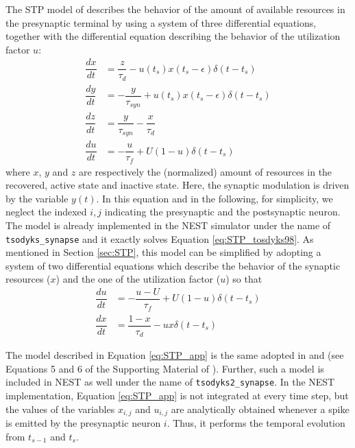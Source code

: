 \documentclass[a4paper, 12pt, twoside, openright]{book}
\begin{document}
The STP model of \cite{tsodyks1998, tsodyks2000} describes the behavior of the amount of available resources in the presynaptic terminal by using a system of three differential equations, together with the differential equation describing the behavior of the utilization factor $u$:
\begin{equation}
    \label{eq:STP_tosdyks98}
    \begin{split}
    \dfrac{dx}{dt} &= \dfrac{z}{\tau_d} - u(t_s)x(t_s -\epsilon) \delta (t-t_s) \\
    \dfrac{dy}{dt} &= -\dfrac{y}{\tau_{syn}} + u(t_s)x(t_s-\epsilon) \delta (t-t_s) \\
    \dfrac{dz}{dt} &= \dfrac{y}{\tau_{syn}} - \dfrac{x}{\tau_{d}} \\
    \dfrac{du}{dt} &= -\dfrac{u}{\tau_f} + U(1-u)\delta (t-t_s)
    \end{split}
\end{equation}
where $x$, $y$ and $z$ are respectively the (normalized) amount of resources in the recovered, active state and inactive state. Here, the synaptic modulation is driven by the variable $y(t)$. In this equation and in the following, for simplicity, we neglect the indexed $i,j$ indicating the presynaptic and the postsynaptic neuron.
The model is already implemented in the NEST simulator under the name of \texttt{tsodyks\_synapse} and it exactly solves Equation \eqref{eq:STP_tosdyks98}. As mentioned in Section \ref{sec:STP}, this model can be simplified by adopting a system of two differential equations which describe the behavior of the synaptic resources ($x$) and the one of the utilization factor ($u$) \cite{tsodyks1998} so that 
\begin{equation}
    \label{eq:STP_app}
    \begin{split}
    \dfrac{du}{dt} &= -\dfrac{u-U}{\tau_f} + U(1-u)\delta (t-t_s) \\
    \dfrac{dx}{dt} &= \dfrac{1-x}{\tau_d} - ux \delta (t-t_s)
    \end{split}
\end{equation}

The model described in Equation \eqref{eq:STP_app} is the same adopted in \cite{barak_tsodyks2007} and \cite{Mongillo2008} (see Equations 5 and 6 of the Supporting Material of \cite{Mongillo2008}). Further, such a model is included in NEST as well under the name of \texttt{tsodyks2\_synapse}. In the NEST implementation, Equation \eqref{eq:STP_app} is not integrated at every time step, but the values of the variables $x_{i,j}$ and $u_{i,j}$ are analytically obtained whenever a spike is emitted by the presynaptic neuron $i$. Thus, it performs the temporal evolution from $t_{s-1}$ and $t_s$. 
\end{document}
